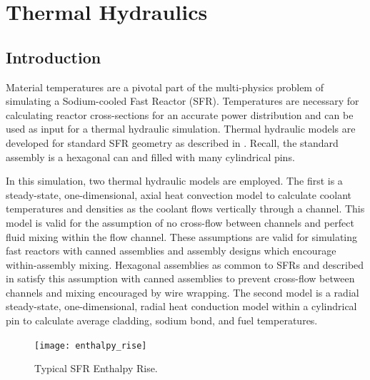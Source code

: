 \chapter{Thermal Hydraulics}
\label{ch:thermalHydraulics}

\section{Introduction}
  Material temperatures are a pivotal part of the multi-physics problem of
  simulating a Sodium-cooled Fast Reactor (SFR). Temperatures are necessary for
  calculating reactor cross-sections for an accurate power distribution and can
  be used as input for a thermal hydraulic simulation. Thermal hydraulic models
  are developed for standard SFR geometry as described in
  . Recall, the standard assembly is a hexagonal 
  can and filled with many cylindrical pins. 

  In this simulation, two thermal hydraulic models are employed. The first is a 
  steady-state, one-dimensional, axial heat convection model to calculate coolant 
  temperatures and densities as the coolant flows vertically through a channel.
  This model is valid for the assumption of no cross-flow between channels and 
  perfect fluid mixing within the flow channel. These assumptions are valid for
  simulating fast reactors with canned assemblies and assembly designs which 
  encourage within-assembly mixing. Hexagonal assemblies as common to SFRs and 
  described in  satisfy this assumption with 
  canned assemblies to prevent cross-flow between channels and mixing encouraged
  by wire wrapping. The second model is a radial steady-state, one-dimensional,
  radial heat conduction model within a cylindrical pin to calculate average 
  cladding, sodium bond, and fuel temperatures.
  
  \begin{figure}
    \centering
    \texttt{[image: enthalpy\_rise]}
    \caption{Typical SFR Enthalpy Rise.}
    \label{fig:enthalpy_rise}
  \end{figure}

